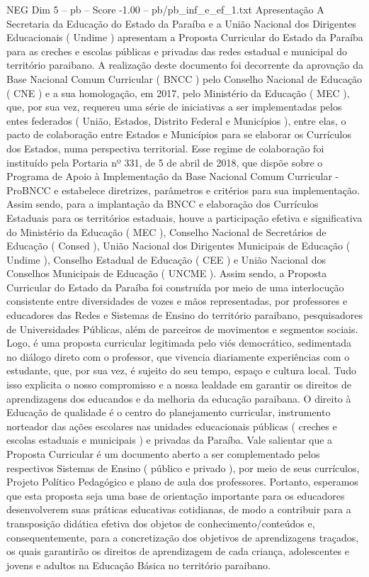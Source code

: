\begin{textsample}{NEG Dim 5 – pb – Score -1.00 – pb/pb\_inf\_e\_ef\_1.txt}  \label{ex:f5_neg_195}
Apresentação A Secretaria da Educação do Estado da Paraíba e a União Nacional dos Dirigentes Educacionais ( Undime ) apresentam a Proposta Curricular do Estado da Paraíba para as creches e escolas públicas e privadas das redes estadual e municipal do território paraibano.
A realização deste documento foi decorrente da aprovação da Base Nacional Comum Curricular ( BNCC ) pelo Conselho Nacional de Educação ( CNE ) e a sua homologação, em 2017, pelo Ministério da Educação ( MEC ), que, por sua vez, requereu uma série de iniciativas a ser implementadas pelos entes federados ( União, Estados, Distrito Federal e Municípios ), entre elas, o pacto de colaboração entre Estados e Municípios para se elaborar os Currículos dos Estados, numa perspectiva territorial.
Esse regime de colaboração foi instituído pela Portaria nº 331, de 5 de abril de 2018, que dispõe sobre o Programa de Apoio à Implementação da Base Nacional Comum Curricular - ProBNCC e estabelece diretrizes, parâmetros e critérios para sua implementação.
Assim sendo, para a implantação da BNCC e elaboração dos Currículos Estaduais para os territórios estaduais, houve a participação efetiva e significativa do Ministério da Educação ( MEC ), Conselho Nacional de Secretários de Educação ( Consed ), União Nacional dos Dirigentes Municipais de Educação ( Undime ), Conselho Estadual de Educação ( CEE ) e União Nacional dos Conselhos Municipais de Educação ( UNCME ).
Assim sendo, a Proposta Curricular do Estado da Paraíba foi construída por meio de uma interlocução consistente entre diversidades de vozes e mãos representadas, por professores e educadores das Redes e Sistemas de Ensino do território paraibano, pesquisadores de Universidades Públicas, além de parceiros de movimentos e segmentos sociais.
Logo, é uma proposta curricular legitimada pelo viés democrático, sedimentada no diálogo direto com o professor, que vivencia diariamente experiências com o estudante, que, por sua vez, é sujeito do seu tempo, espaço e cultura local.
Tudo isso explicita o nosso compromisso e a nossa lealdade em garantir os direitos de aprendizagens dos educandos e da melhoria da educação paraibana.
O direito à Educação de qualidade é o centro do planejamento curricular, instrumento norteador das ações escolares nas unidades educacionais públicas ( creches e escolas estaduais e municipais ) e privadas da Paraíba.
Vale salientar que a Proposta Curricular é um documento aberto a ser complementado pelos respectivos Sistemas de Ensino ( público e privado ), por meio de seus currículos, Projeto Político Pedagógico e plano de aula dos professores.
Portanto, esperamos que esta proposta seja uma base de orientação importante para os educadores desenvolverem suas práticas educativas cotidianas, de modo a contribuir para a transposição didática efetiva dos objetos de conhecimento/conteúdos e, consequentemente, para a concretização dos objetivos de aprendizagens traçados, os quais garantirão os direitos de aprendizagem de cada criança, adolescentes e jovens e adultos na Educação Básica no território paraibano.

\end{textsample}
